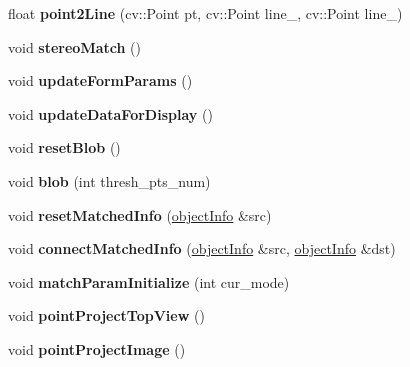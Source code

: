\begin{DoxyCompactItemize}
\item 
\hypertarget{classstereo__vision_a45dc1b4c26fa70b641ad31f4b307f0c8}{}float {\bfseries point2\+Line} (cv\+::\+Point pt, cv\+::\+Point line\+\_, cv\+::\+Point line\+\_)\label{classstereo__vision_a45dc1b4c26fa70b641ad31f4b307f0c8}

\item 
\hypertarget{classstereo__vision_a74c36c45aa91e35150ceb51c3ddf0c03}{}void {\bfseries stereo\+Match} ()\label{classstereo__vision_a74c36c45aa91e35150ceb51c3ddf0c03}

\item 
\hypertarget{classstereo__vision_aa809afbb9b4bcf9430a12d3fe2bf0a83}{}void {\bfseries update\+Form\+Params} ()\label{classstereo__vision_aa809afbb9b4bcf9430a12d3fe2bf0a83}

\item 
\hypertarget{classstereo__vision_acb993e7cbfb1a1745fcc3cc4b7ad4aaa}{}void {\bfseries update\+Data\+For\+Display} ()\label{classstereo__vision_acb993e7cbfb1a1745fcc3cc4b7ad4aaa}

\item 
\hypertarget{classstereo__vision_a6928cbfd7d4ee3834d3ef9b4f2fe4588}{}void {\bfseries reset\+Blob} ()\label{classstereo__vision_a6928cbfd7d4ee3834d3ef9b4f2fe4588}

\item 
\hypertarget{classstereo__vision_ac9520d8ca3fe11aba04a5d11a65ee0df}{}void {\bfseries blob} (int thresh\+\_\+pts\+\_\+num)\label{classstereo__vision_ac9520d8ca3fe11aba04a5d11a65ee0df}

\item 
\hypertarget{classstereo__vision_ab8b62349e5049fe2d61e3de5a2d5477c}{}void {\bfseries reset\+Matched\+Info} (\hyperlink{structstereo__vision_1_1object_info}{object\+Info} \&src)\label{classstereo__vision_ab8b62349e5049fe2d61e3de5a2d5477c}

\item 
\hypertarget{classstereo__vision_a541abf632d62e399866cd7d265673063}{}void {\bfseries connect\+Matched\+Info} (\hyperlink{structstereo__vision_1_1object_info}{object\+Info} \&src, \hyperlink{structstereo__vision_1_1object_info}{object\+Info} \&dst)\label{classstereo__vision_a541abf632d62e399866cd7d265673063}

\item 
\hypertarget{classstereo__vision_a99a62cb0c6c16f46d420b5f4d0379a48}{}void {\bfseries match\+Param\+Initialize} (int cur\+\_\+mode)\label{classstereo__vision_a99a62cb0c6c16f46d420b5f4d0379a48}

\item 
\hypertarget{classstereo__vision_aa3fd13ec1a7eec08eb964e5339d653f6}{}void {\bfseries point\+Project\+Top\+View} ()\label{classstereo__vision_aa3fd13ec1a7eec08eb964e5339d653f6}

\item 
\hypertarget{classstereo__vision_a265f15ae20bfad32d0b3091c29d54021}{}void {\bfseries point\+Project\+Image} ()\label{classstereo__vision_a265f15ae20bfad32d0b3091c29d54021}

\end{DoxyCompactItemize}
